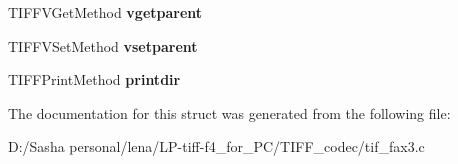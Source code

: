 \begin{DoxyCompactItemize}
\item 
\hypertarget{struct_fax3_base_state_a6aa94880716a95ef6ecb6504e377e504}{}T\+I\+F\+F\+V\+Get\+Method {\bfseries vgetparent}\label{struct_fax3_base_state_a6aa94880716a95ef6ecb6504e377e504}

\item 
\hypertarget{struct_fax3_base_state_ad3e8072d4883a6686f64fb7671e9b3c1}{}T\+I\+F\+F\+V\+Set\+Method {\bfseries vsetparent}\label{struct_fax3_base_state_ad3e8072d4883a6686f64fb7671e9b3c1}

\item 
\hypertarget{struct_fax3_base_state_ac3f672c5186abaf1350e3e0b70245ad7}{}T\+I\+F\+F\+Print\+Method {\bfseries printdir}\label{struct_fax3_base_state_ac3f672c5186abaf1350e3e0b70245ad7}

\end{DoxyCompactItemize}


The documentation for this struct was generated from the following file\+:\begin{DoxyCompactItemize}
\item 
D\+:/\+Sasha personal/lena/\+L\+P-\/tiff-\/f4\+\_\+for\+\_\+\+P\+C/\+T\+I\+F\+F\+\_\+codec/tif\+\_\+fax3.\+c\end{DoxyCompactItemize}

